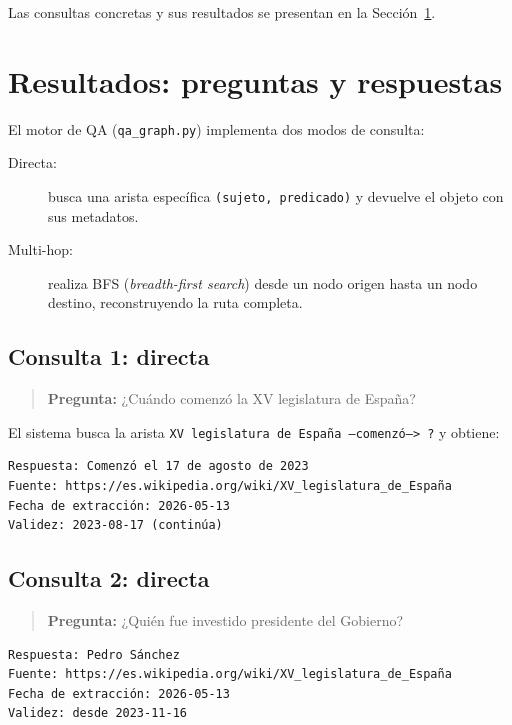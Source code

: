 \documentclass[12pt,a4paper]{article}
\begin{document}
Las consultas concretas y sus resultados se presentan en la Sección~\ref{sec:qa}.

\section{Resultados: preguntas y respuestas}
\label{sec:qa}

El motor de QA (\texttt{qa\_graph.py}) implementa dos modos de consulta:

\begin{description}
  \item[Directa:] busca una arista específica \texttt{(sujeto, predicado)} y devuelve el objeto con sus metadatos.
  \item[Multi-hop:] realiza BFS (\textit{breadth-first search}) desde un nodo origen hasta un nodo destino, reconstruyendo la ruta completa.
\end{description}

\subsection{Consulta 1: directa}
\label{q1}

\begin{quote}
\textbf{Pregunta:} ¿Cuándo comenzó la XV legislatura de España?
\end{quote}

El sistema busca la arista \texttt{XV legislatura de España --comenzó--> ?} y obtiene:

\begin{lstlisting}
Respuesta: Comenzó el 17 de agosto de 2023
Fuente: https://es.wikipedia.org/wiki/XV_legislatura_de_España
Fecha de extracción: 2026-05-13
Validez: 2023-08-17 (continúa)
\end{lstlisting}

\subsection{Consulta 2: directa}
\label{q2}

\begin{quote}
\textbf{Pregunta:} ¿Quién fue investido presidente del Gobierno?
\end{quote}

\begin{lstlisting}
Respuesta: Pedro Sánchez
Fuente: https://es.wikipedia.org/wiki/XV_legislatura_de_España
Fecha de extracción: 2026-05-13
Validez: desde 2023-11-16
\end{lstlisting}
\end{document}
